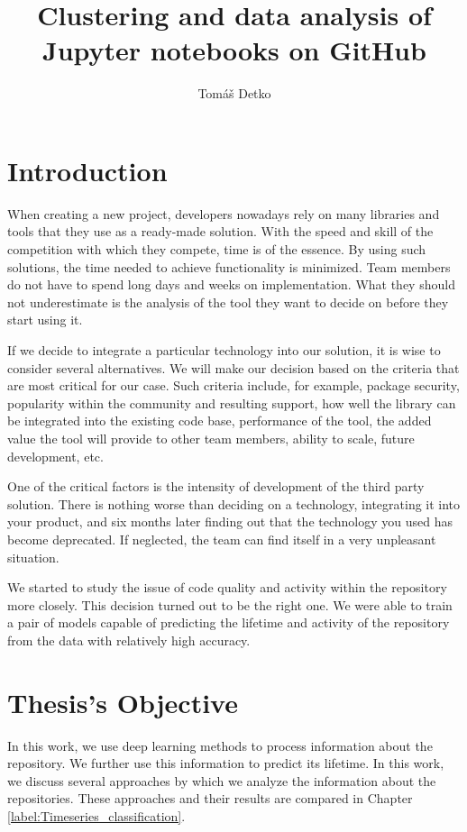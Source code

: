 \documentclass[thesis=M,english]{FITthesis}[2019/12/23]
\title{Clustering and data analysis of Jupyter notebooks on GitHub}
\author{Tom{\' a}{\v s} Detko} %
\begin{document}
\chapter{Introduction}

When creating a new project, developers nowadays rely on many libraries and tools that they use as a ready-made solution. 
With the speed and skill of the competition with which they compete, time is of the essence. By using such solutions, the time needed to achieve functionality is minimized. Team members do not have to spend long days and weeks on implementation. What they should not underestimate is the analysis of the tool they want to decide on before they start using it.

If we decide to integrate a particular technology into our solution, it is wise to consider several alternatives. We will make our decision based on the criteria that are most critical for our case. Such criteria include, for example, package security, popularity within the community and resulting support, how well the library can be integrated into the existing code base, performance of the tool, the added value the tool will provide to other team members, ability to scale, future development, etc.

One of the critical factors is the intensity of development of the third party solution. There is nothing worse than deciding on a technology, integrating it into your product, and six months later finding out that the technology you used has become deprecated. If neglected, the team can find itself in a very unpleasant situation.  

We started to study the issue of code quality and activity within the repository more closely. This decision turned out to be the right one. We were able to train a pair of models capable of predicting the lifetime and activity of the repository from the data with relatively high accuracy.

\chapter{Thesis's Objective}
In this work, we use deep learning methods to process information about the repository. We further use this information to predict its lifetime. In this work, we discuss several approaches by which we analyze the information about the repositories. These approaches and their results are compared in Chapter \ref{label:Timeseries_classification}.
\end{document}
